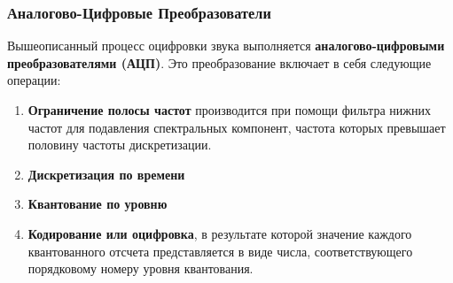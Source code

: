 \documentclass[a4paper]{report}
\begin{document}
\subsubsection{Аналогово-Цифровые Преобразователи}
Вышеописанный процесс оцифровки звука выполняется
\textbf{аналогово-цифровыми преобразователями (АЦП)}.
Это преобразование включает в себя следующие операции:
\begin{enumerate}
\item \textbf{Ограничение полосы частот} производится при помощи фильтра нижних частот для подавления спектральных компонент, частота которых превышает половину частоты дискретизации.
\item \textbf{Дискретизация по времени}
\item \textbf{Квантование по уровню}
\item \textbf{Кодирование или оцифровка}, в результате которой значение каждого квантованного отсчета представляется в виде числа, соответствующего порядковому номеру уровня квантования.
\end{enumerate}
\end{document}
